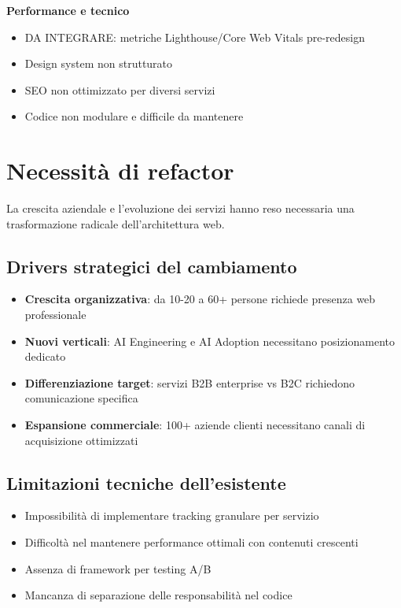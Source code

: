 \textbf{Performance e tecnico}
\begin{itemize}
  \item DA INTEGRARE: metriche Lighthouse/Core Web Vitals pre-redesign
  \item Design system non strutturato
  \item SEO non ottimizzato per diversi servizi
  \item Codice non modulare e difficile da mantenere
\end{itemize}

\section{Necessità di refactor}
La crescita aziendale e l'evoluzione dei servizi hanno reso necessaria una trasformazione radicale dell'architettura web.

\subsection{Drivers strategici del cambiamento}
\begin{itemize}
  \item \textbf{Crescita organizzativa}: da 10-20 a 60+ persone richiede presenza web professionale
  \item \textbf{Nuovi verticali}: AI Engineering e AI Adoption necessitano posizionamento dedicato
  \item \textbf{Differenziazione target}: servizi B2B enterprise vs B2C richiedono comunicazione specifica
  \item \textbf{Espansione commerciale}: 100+ aziende clienti necessitano canali di acquisizione ottimizzati
\end{itemize}

\subsection{Limitazioni tecniche dell'esistente}
\begin{itemize}
  \item Impossibilità di implementare tracking granulare per servizio
  \item Difficoltà nel mantenere performance ottimali con contenuti crescenti
  \item Assenza di framework per testing A/B
  \item Mancanza di separazione delle responsabilità nel codice
\end{itemize}

